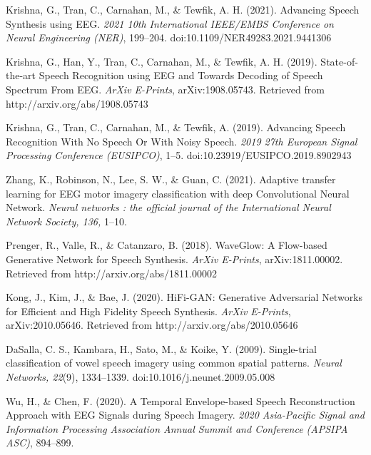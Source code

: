 \documentclass{article}
\begin{document}
\begin{thebibliography}{9}
 Krishna, G., Tran, C., Carnahan, M., \& Tewfik, A. H. (2021). Advancing Speech Synthesis using EEG. {\it 2021 10th International IEEE/EMBS Conference on Neural Engineering (NER)}, 199–204. doi:10.1109/NER49283.2021.9441306

  Krishna, G., Han, Y., Tran, C., Carnahan, M., \& Tewfik, A. H. (2019). State-of-the-art Speech Recognition using EEG and Towards Decoding of Speech Spectrum From EEG. {\it ArXiv E-Prints}, arXiv:1908.05743. Retrieved from http://arxiv.org/abs/1908.05743

  Krishna, G., Tran, C., Carnahan, M., \& Tewfik, A. (2019). Advancing Speech Recognition With No Speech Or With Noisy Speech. {\it 2019 27th European Signal Processing Conference (EUSIPCO)}, 1–5. doi:10.23919/EUSIPCO.2019.8902943

 Zhang, K., Robinson, N., Lee, S. W., \& Guan, C. (2021). Adaptive transfer learning for EEG motor imagery classification with deep Convolutional Neural Network. {\it Neural networks : the official journal of the International Neural Network Society, 136,} 1–10.

 Prenger, R., Valle, R., \& Catanzaro, B. (2018). WaveGlow: A Flow-based Generative Network for Speech Synthesis. {\it ArXiv E-Prints}, arXiv:1811.00002. Retrieved from http://arxiv.org/abs/1811.00002

 Kong, J., Kim, J., \& Bae, J. (2020). HiFi-GAN: Generative Adversarial Networks for Efficient and High Fidelity Speech Synthesis. {\it ArXiv E-Prints}, arXiv:2010.05646. Retrieved from http://arxiv.org/abs/2010.05646

 DaSalla, C. S., Kambara, H., Sato, M., \& Koike, Y. (2009). Single-trial classification of vowel speech imagery using common spatial patterns. {\it Neural Networks, 22}(9), 1334–1339. doi:10.1016/j.neunet.2009.05.008

 Wu, H., \& Chen, F. (2020). A Temporal Envelope-based Speech Reconstruction Approach with EEG Signals during Speech Imagery. {\it 2020 Asia-Pacific Signal and Information Processing Association Annual Summit and Conference (APSIPA ASC)}, 894–899.



\end{thebibliography}
\end{document}
